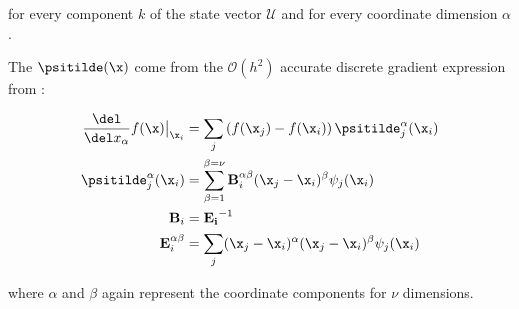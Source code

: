 for every component $k$ of the state vector $\mathcal{U}$ and for every coordinate dimension
$\alpha$.

The $\psitilde(\x)$ come from the $\mathcal{O}(h^2)$ accurate discrete gradient expression from \cite{lansonRenormalizedMeshfreeSchemes2008}:

\begin{align}
	\frac{\del}{\del x_{\alpha}} f(\x) \big{|}_{\x_i} &= 
	\sum_j \left( f(\x_j) - f(\x_i) \right) \psitilde_j^\alpha (\x_i) 		\label{eq:gradient} \\
	\psitilde_j^\alpha (\x_i) &= \sum_{\beta = 1}^{\beta=\nu} \mathbf{B}_i^{\alpha \beta} 
	(\x_j - \x_i)^\beta \psi_j(\x_i) 	\\
	\mathbf{B}_i &= \mathbf{E_i} ^ {-1} \\ 
	\mathbf{E}_i^{\alpha \beta} &= \sum_j (\x_j - \x_i)^\alpha (\x_j - \x_i)^\beta \psi_j(\x_i)
\end{align}


where $\alpha$ and $\beta$ again represent the coordinate components for $\nu$ dimensions.
